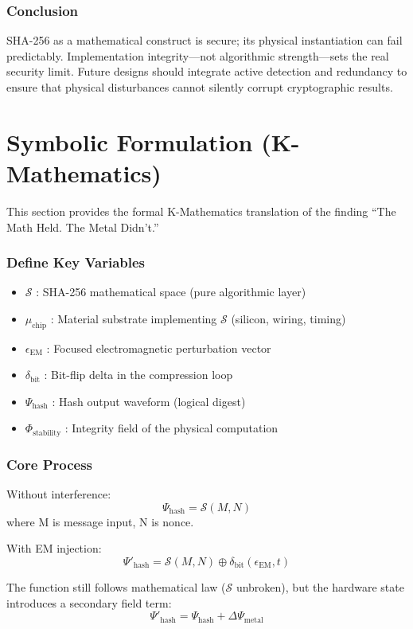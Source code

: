 \documentclass[11pt, a4paper]{article}
\begin{document}
\section{Conclusion}
SHA-256 as a mathematical construct is secure; its physical instantiation can fail predictably. Implementation integrity---not algorithmic strength---sets the real security limit. Future designs should integrate active detection and redundancy to ensure that physical disturbances cannot silently corrupt cryptographic results.

\newpage
\part{Symbolic Formulation (K-Mathematics)}
\label{part:k_math_translation}

This section provides the formal K-Mathematics translation of the finding ``The Math Held. The Metal Didn't.''

\section{Define Key Variables}
\begin{itemize}
    \item $\mathcal{S}$ : SHA-256 mathematical space (pure algorithmic layer)
    \item $\mu_{\text{chip}}$ : Material substrate implementing $\mathcal{S}$ (silicon, wiring, timing)
    \item $\epsilon_{\text{EM}}$ : Focused electromagnetic perturbation vector
    \item $\delta_{\text{bit}}$ : Bit-flip delta in the compression loop
    \item $\Psi_{\text{hash}}$ : Hash output waveform (logical digest)
    \item $\Phi_{\text{stability}}$ : Integrity field of the physical computation
\end{itemize}

\section{Core Process}
Without interference:
$$ \Psi_{\text{hash}} = \mathcal{S}(M, N) $$
where M is message input, N is nonce.

With EM injection:
$$ \Psi'_{\text{hash}} = \mathcal{S}(M, N) \oplus \delta_{\text{bit}}(\epsilon_{\text{EM}}, t) $$

The function still follows mathematical law ($\mathcal{S}$ unbroken), but the hardware state introduces a secondary field term:
$$ \Psi'_{\text{hash}} = \Psi_{\text{hash}} + \Delta\Psi_{\text{metal}} $$
\end{document}
